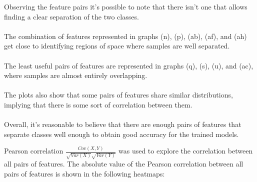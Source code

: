 \documentclass[12pt,a4paper]{article}
\begin{document}
\begin{figure}
\begin{center}
\begin{tabular}{ccc}
        \end{tabular}
    \end{center}
\end{figure}

Observing the feature pairs it's possible to note that there isn't one that allows finding a clear separation of the two classes. \\ \\
The combination of features represented in graphs (n), (p), (ab), (af), and (ah) get close to identifying regions of space where samples are well separated. \\ \\
The least useful pairs of features are represented in graphs (q), (s), (u), and (ac), where samples are almost entirely overlapping. \\ \\
The plots also show that some pairs of features share similar distributions, implying that there is some sort of correlation between them. \\ \\
Overall, it's reasonable to believe that there are enough pairs of features that separate classes well enough to obtain good accuracy for the trained models.

\clearpage

Pearson correlation \( \frac{Cov(X,Y)}{\sqrt{Var(X)}\sqrt{Var(Y)}} \) was used to explore the correlation between all pairs of features.
The absolute value of the Pearson correlation between all pairs of features is shown in the following heatmaps: \\
\end{document}
